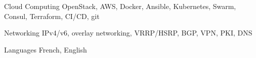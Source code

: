 

\begin{cvskills}

  \cvskill
    {Cloud Computing}
    {OpenStack, AWS, Docker, Ansible, Kubernetes, Swarm, Consul,
    Terraform, CI/CD, git}

  \cvskill
    {Networking}
    {IPv4/v6, overlay networking, VRRP/HSRP, BGP, VPN, PKI, DNS}

  \cvskill
    {Languages} %
    {French, English} %

\end{cvskills}
